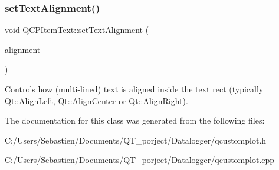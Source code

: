 \subsubsection{\texorpdfstring{set\+Text\+Alignment()}{setTextAlignment()}}
{\footnotesize\ttfamily void Q\+C\+P\+Item\+Text\+::set\+Text\+Alignment (\begin{DoxyParamCaption}\item[{Qt\+::\+Alignment}]{alignment }\end{DoxyParamCaption})}

Controls how (multi-\/lined) text is aligned inside the text rect (typically Qt\+::\+Align\+Left, Qt\+::\+Align\+Center or Qt\+::\+Align\+Right). 

The documentation for this class was generated from the following files\+:\begin{DoxyCompactItemize}
\item 
C\+:/\+Users/\+Sebastien/\+Documents/\+Q\+T\+\_\+porject/\+Datalogger/qcustomplot.\+h\item 
C\+:/\+Users/\+Sebastien/\+Documents/\+Q\+T\+\_\+porject/\+Datalogger/qcustomplot.\+cpp\end{DoxyCompactItemize}
